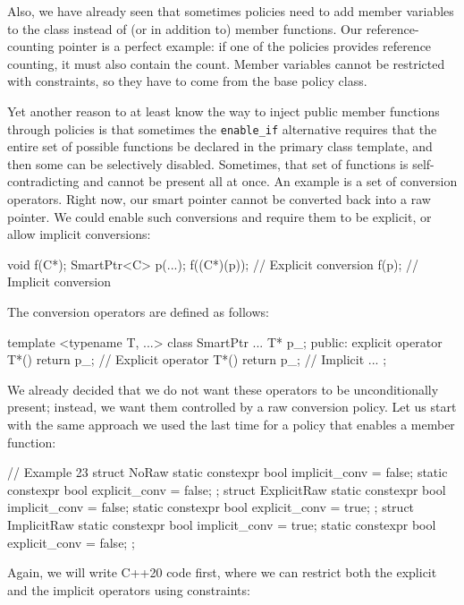 Also, we have already seen that sometimes policies need to add member variables to the class instead of (or in addition to) member functions. Our reference-counting pointer is a perfect example: if one of the policies provides reference counting, it must also contain the count. Member variables cannot be restricted with constraints, so they have to come from the base policy class.

Yet another reason to at least know the way to inject public member functions through policies is that sometimes the \texttt{enable\_if} alternative requires that the entire set of possible functions be declared in the primary class template, and then some can be selectively disabled. Sometimes, that set of functions is self-contradicting and cannot be present all at once. An example is a set of conversion operators. Right now, our smart pointer cannot be converted back into a raw pointer. We could enable such conversions and require them to be explicit, or allow implicit conversions:

\begin{code}
void f(C*);
SmartPtr<C> p(...);
f((C*)(p));     // Explicit conversion
f(p);         // Implicit conversion
\end{code}

The conversion operators are defined as follows:

\begin{code}
template <typename T, ...>
class SmartPtr ... {
  T* p_;
  public:
  explicit operator T*() { return p_; } // Explicit
  operator T*() { return p_; }          // Implicit
  ...
};
\end{code}

We already decided that we do not want these operators to be unconditionally present; instead, we want them controlled by a raw conversion policy. Let us start with the same approach we used the last time for a policy that enables a member function:

\begin{code}
// Example 23
struct NoRaw {
  static constexpr bool implicit_conv = false;
  static constexpr bool explicit_conv = false;
};
struct ExplicitRaw {
  static constexpr bool implicit_conv = false;
  static constexpr bool explicit_conv = true;
};
struct ImplicitRaw {
  static constexpr bool implicit_conv = true;
  static constexpr bool explicit_conv = false;
};
\end{code}

Again, we will write C++20 code first, where we can restrict both the explicit and the implicit operators using constraints:


